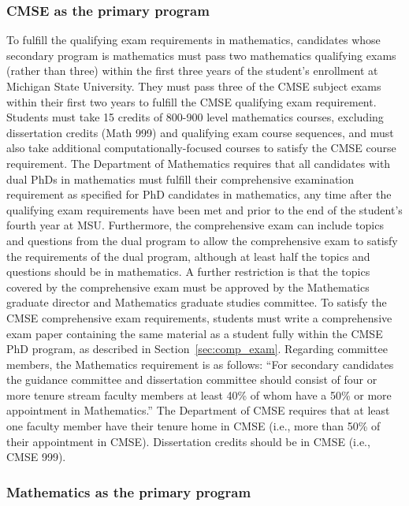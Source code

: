 \subsubsection{CMSE as the primary program}

To fulfill the qualifying exam requirements in mathematics, candidates
whose secondary program is mathematics must pass two mathematics
qualifying exams (rather than three) within the first three years of
the student’s enrollment at Michigan State University.  They must pass
three of the CMSE subject exams within their first two years to
fulfill the CMSE qualifying exam requirement.  Students must take 15
credits of 800-900 level mathematics courses, excluding dissertation
credits (Math 999) and qualifying exam course sequences, and must also
take additional computationally-focused courses to satisfy the CMSE
course requirement.  The Department of Mathematics requires that all
candidates with dual PhDs in mathematics must fulfill their
comprehensive examination requirement as specified for PhD candidates
in mathematics, any time after the qualifying exam requirements have
been met and prior to the end of the student's fourth year at MSU.
Furthermore, the comprehensive exam can include topics and questions
from the dual program to allow the comprehensive exam to satisfy the
requirements of the dual program, although at least half the topics
and questions should be in mathematics.  A further restriction is that
the topics covered by the comprehensive exam must be approved by the
Mathematics graduate director and Mathematics graduate studies
committee.  To  satisfy the CMSE comprehensive exam
requirements, students must write a comprehensive exam paper
containing the same material as a student fully within the CMSE PhD
program, as described in Section~\ref{sec:comp_exam}.  Regarding
committee members, the Mathematics requirement is as follows: ``For
secondary candidates the guidance committee and dissertation committee
should consist of four or more tenure stream faculty members at least
40\% of whom have a 50\% or more appointment in Mathematics.''  The
Department of CMSE requires that at least one faculty member have
their tenure home in CMSE (i.e., more than 50\% of their appointment
in CMSE).  Dissertation credits should be in CMSE (i.e., CMSE 999).


\subsubsection{Mathematics as the primary program}

